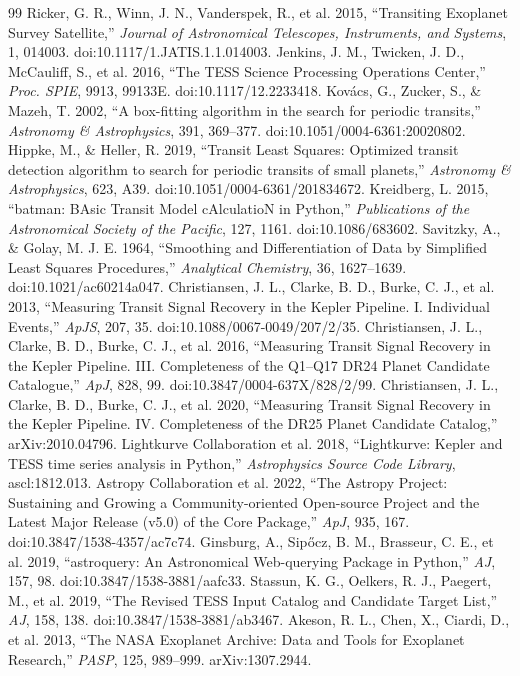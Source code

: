 \documentclass[11pt]{article}
\begin{document}
\begin{thebibliography}{99}
 Ricker, G. R., Winn, J. N., Vanderspek, R., et al. 2015, ``Transiting Exoplanet Survey Satellite,'' \textit{Journal of Astronomical Telescopes, Instruments, and Systems}, 1, 014003. doi:10.1117/1.JATIS.1.1.014003.
 Jenkins, J. M., Twicken, J. D., McCauliff, S., et al. 2016, ``The TESS Science Processing Operations Center,'' \textit{Proc. SPIE}, 9913, 99133E. doi:10.1117/12.2233418.
 Kov\'acs, G., Zucker, S., \& Mazeh, T. 2002, ``A box-fitting algorithm in the search for periodic transits,'' \textit{Astronomy \& Astrophysics}, 391, 369--377. doi:10.1051/0004-6361:20020802.
 Hippke, M., \& Heller, R. 2019, ``Transit Least Squares: Optimized transit detection algorithm to search for periodic transits of small planets,'' \textit{Astronomy \& Astrophysics}, 623, A39. doi:10.1051/0004-6361/201834672.
 Kreidberg, L. 2015, ``batman: BAsic Transit Model cAlculatioN in Python,'' \textit{Publications of the Astronomical Society of the Pacific}, 127, 1161. doi:10.1086/683602.
 Savitzky, A., \& Golay, M. J. E. 1964, ``Smoothing and Differentiation of Data by Simplified Least Squares Procedures,'' \textit{Analytical Chemistry}, 36, 1627--1639. doi:10.1021/ac60214a047.
 Christiansen, J. L., Clarke, B. D., Burke, C. J., et al. 2013, ``Measuring Transit Signal Recovery in the Kepler Pipeline. I. Individual Events,'' \textit{ApJS}, 207, 35. doi:10.1088/0067-0049/207/2/35.
 Christiansen, J. L., Clarke, B. D., Burke, C. J., et al. 2016, ``Measuring Transit Signal Recovery in the Kepler Pipeline. III. Completeness of the Q1--Q17 DR24 Planet Candidate Catalogue,'' \textit{ApJ}, 828, 99. doi:10.3847/0004-637X/828/2/99.
 Christiansen, J. L., Clarke, B. D., Burke, C. J., et al. 2020, ``Measuring Transit Signal Recovery in the Kepler Pipeline. IV. Completeness of the DR25 Planet Candidate Catalog,'' arXiv:2010.04796.
 Lightkurve Collaboration et al. 2018, ``Lightkurve: Kepler and TESS time series analysis in Python,'' \textit{Astrophysics Source Code Library}, ascl:1812.013.
 Astropy Collaboration et al. 2022, ``The Astropy Project: Sustaining and Growing a Community-oriented Open-source Project and the Latest Major Release (v5.0) of the Core Package,'' \textit{ApJ}, 935, 167. doi:10.3847/1538-4357/ac7c74.
 Ginsburg, A., Sip\H{o}cz, B. M., Brasseur, C. E., et al. 2019, ``astroquery: An Astronomical Web-querying Package in Python,'' \textit{AJ}, 157, 98. doi:10.3847/1538-3881/aafc33.
 Stassun, K. G., Oelkers, R. J., Paegert, M., et al. 2019, ``The Revised TESS Input Catalog and Candidate Target List,'' \textit{AJ}, 158, 138. doi:10.3847/1538-3881/ab3467.
 Akeson, R. L., Chen, X., Ciardi, D., et al. 2013, ``The NASA Exoplanet Archive: Data and Tools for Exoplanet Research,'' \textit{PASP}, 125, 989--999. arXiv:1307.2944.
\end{thebibliography}
\end{document}

